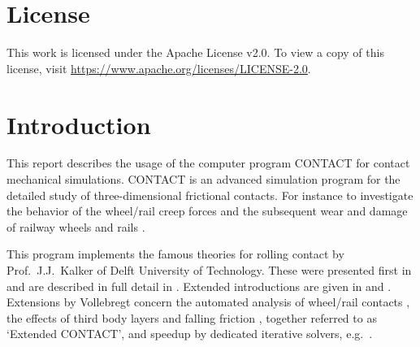 \documentclass[12pt]{report}
\begin{document}
\tableofcontents

\clearpage
\chapter*{License}

This work is licensed under the Apache License v2.0. To view a copy of this
license, visit
\href{https://www.apache.org/licenses/LICENSE-2.0}{https://\-www.apache.org/licenses/LICENSE-2.0}.


\clearpage


\chapter{Introduction}
\label{chp:introduction}

This report describes the usage of the computer program CONTACT for contact
mechanical simulations. CONTACT is an advanced simulation program for the
detailed study of three-dimensional frictional contacts. For instance to
investigate the behavior of the wheel/rail creep forces and the subsequent
wear and damage of railway wheels and rails \cite{Meymand2016a-review,
Vollebregt2021a-soa-paper}.

This program implements the famous theories for rolling contact by Prof.\
J.J.\ Kalker of Delft University of Technology. These were presented first
in \cite{Kalker1979a} and are described in full detail in
\cite{Kalker1990}. Extended introductions are given in \cite{Kalker2000}
and \cite{Vollebregt2011a-assessm}. Extensions by Vollebregt concern the
automated analysis of wheel/rail contacts \cite{Vollebregt2020b-wrgeom,
Vollebregt2020c-distr-force,Vollebregt2022b-cm2022,
Vollebregt2023a-iavsd2023}, the effects of third
body layers \cite{Vollebregt2014c-tractcurv,Vollebregt2019a-fra} and
falling friction \cite{Vollebregt2012a-quasistd}, together referred to as
`Extended CONTACT', and speedup by dedicated iterative solvers, e.g.\
\cite{Vollebregt2014a-fftprec,Zhao_Jing2015a-tangcg}.
\end{document}
